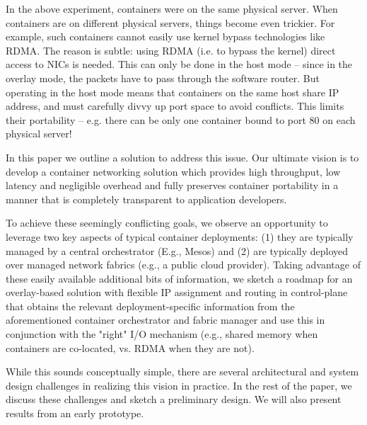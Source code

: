 In the above experiment, containers were on the same physical server. When
containers are on different physical servers, things become even trickier. For
example, such containers cannot easily use kernel bypass technologies like RDMA.
The reason is subtle: using RDMA (i.e. to bypass the kernel) direct access to
NICs is needed. This can only be done in the host mode -- since in the overlay
mode, the packets have to pass through the software router.  But operating in
the host mode means that containers on the same host share IP address, and must
carefully divvy up port space to avoid conflicts.  This limits their portability
-- e.g. there can be only one container bound to port 80 on each physical
server!

In this paper we outline a solution to address this issue.  Our ultimate vision
is to develop a container networking solution which provides high throughput,
low latency and negligible overhead and fully preserves container portability in
a manner that is completely transparent to application developers. 

To achieve these seemingly conflicting goals, we observe an opportunity to
leverage two key aspects of typical container deployments: (1) they are
typically managed by a central orchestrator (E.g., Mesos) and (2) are typically
deployed over managed network fabrics (e.g., a public cloud provider). Taking
advantage of these easily available additional bits of information, we sketch a
roadmap for an overlay-based solution  with flexible IP assignment and routing
in control-plane  that obtains the relevant
deployment-specific information from the aforementioned container orchestrator
and fabric manager and use this in conjunction with the "right" I/O mechanism
(e.g., shared memory when containers are co-located, vs. RDMA when they are
not). 

While this sounds conceptually simple, there are several architectural
and system design challenges in realizing this vision in practice. In the rest
of the paper, we discuss these challenges and sketch a preliminary design. We
will also present results from an early prototype.
